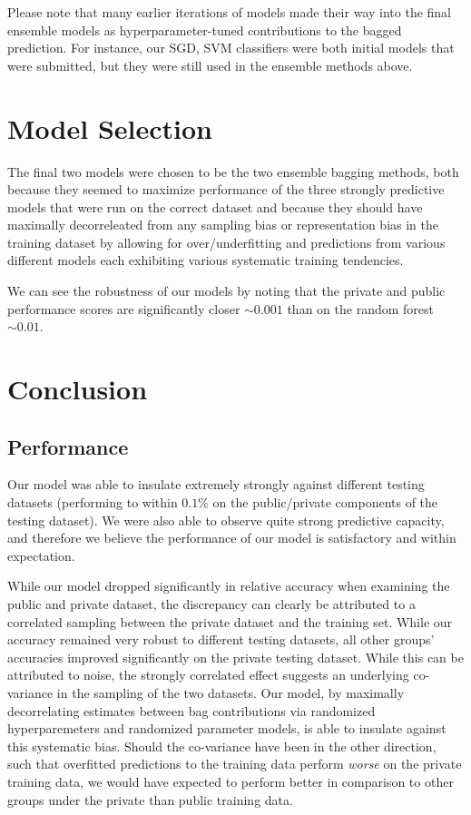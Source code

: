 \documentclass[10pt]{article}
\begin{document}
Please note that many earlier iterations of models made their way into the final ensemble models as hyperparameter-tuned contributions to the bagged prediction. For instance, our SGD, SVM classifiers were both initial models that were submitted, but they were still used in the ensemble methods above.

\section{Model Selection}

The final two models were chosen to be the two ensemble bagging methods, both because they seemed to maximize performance of the three strongly predictive models that were run on the correct dataset and because they should have maximally decorreleated from any sampling bias or representation bias in the training dataset by allowing for over/underfitting and predictions from various different models each exhibiting various systematic training tendencies. 

We can see the robustness of our models by noting that the private and public performance scores are significantly closer $\sim 0.001$ than on the random forest $\sim 0.01$.

\section{Conclusion}

\subsection{Performance}

Our model was able to insulate extremely strongly against different testing datasets (performing to within $0.1\%$ on the public/private components of the testing dataset). We were also able to observe quite strong predictive capacity, and therefore we believe the performance of our model is satisfactory and within expectation.

While our model dropped significantly in relative accuracy when examining the public and private dataset, the discrepancy can clearly be attributed to a correlated sampling between the private dataset and the training set. While our accuracy remained very robust to different testing datasets, all other groups' accuracies improved significantly on the private testing dataset. While this can be attributed to noise, the strongly correlated effect suggests an underlying co-variance in the sampling of the two datasets. Our model, by maximally decorrelating estimates between bag contributions via randomized hyperparemeters and randomized parameter models, is able to insulate against this systematic bias. Should the co-variance have been in the other direction, such that overfitted predictions to the training data perform \emph{worse} on the private training data, we would have expected to perform better in comparison to other groups under the private than public training data.
\end{document}
